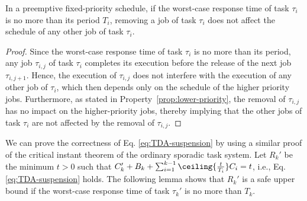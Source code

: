 \begin{Lemma}
\label{lemma:remove-same-task}
In a preemptive fixed-priority schedule, if the worst-case response time of task $\tau_i$ is no more than its period $T_i$, removing a job of task $\tau_i$ does not affect the schedule of any other job of task $\tau_i$.
\end{Lemma}
\begin{proof}
Since the worst-case response time of task $\tau_i$ is no more than its period, any job $\tau_{i,j}$ of task $\tau_i$ completes its execution before the release of the next job $\tau_{i,j+1}$. Hence, the execution of $\tau_{i,j}$ does not interfere with the execution of any other job of $\tau_i$, which then depends only on the schedule of the higher priority jobs. Furthermore, as stated in Property~\ref{prop:lower-priority}, the removal of $\tau_{i,j}$ has no impact on the higher-priority jobs, thereby implying that the other jobs of task $\tau_i$ are not affected by the removal of $\tau_{i,j}$.
\end{proof}

We can prove the correctness of Eq. \eqref{eq:TDA-suspension} by using a similar proof of the critical instant theorem of the ordinary sporadic task system.
Let $R_k'$ be the minimum $t > 0$ such that  $C'_k + B_k + \sum_{i=1}^{k-1}\ceiling{\frac{t}{T_i}} C_i = t$, i.e., Eq. \eqref{eq:TDA-suspension} holds. The following lemma shows that $R_k'$ is a safe upper bound if the worst-case response time of task $\tau_k'$ is no more than $T_k$.

